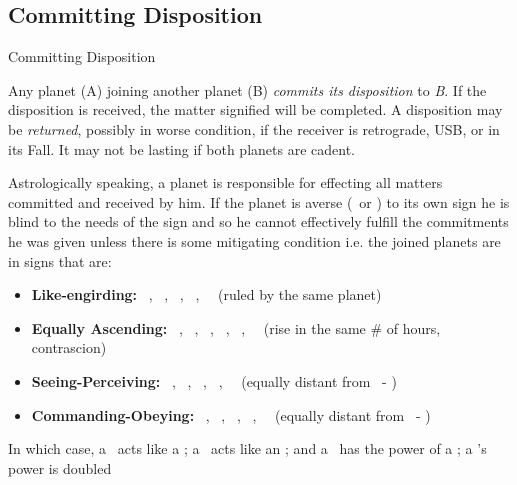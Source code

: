 \subsection{Committing Disposition}
\begin{frame}[t]{Committing Disposition}
\small
\begin{block}{}
Any planet (A) joining another planet (B) \textsl{commits its disposition} to \textsl{B}. If the disposition is received, the matter signified will be completed. A disposition may be \textsl{returned}, possibly in worse condition, if the receiver is retrograde, USB, or in its Fall.  It may not be lasting if both planets are cadent.
\end{block}

Astrologically speaking, a planet is responsible for effecting all matters committed and received by him. If the planet is averse (\Semisextile\ or \Quincunx) to its own sign he is blind to the needs of the sign  and so he cannot effectively fulfill the commitments he was given unless there is some mitigating condition i.e. the joined planets are in signs that are:\footnotemark[1]
\vspace{-0.25cm}
\begin{itemize}
\item \textbf{Like-engirding:}  \Aries\ \Scorpio, \Taurus\  \Libra, \Gemini\ \Virgo, \Sagittarius\ \Pisces,  \Capricorn\ \Aquarius\ (ruled by the same planet)

\item \textbf{Equally Ascending:}  \Aries\ \Pisces, \Taurus\ \Aquarius, \Gemini\ \Capricorn, \Cancer\ \Sagittarius, \Leo\ \Scorpio, \Virgo\ \Libra\ (rise in the same \# of hours, contrascion)

\item \textbf{Seeing-Perceiving:} \Aries\ \Libra, \Taurus\ \Virgo, \Gemini\ \Leo, \Scorpio\ \Pisces, \Sagittarius\ \Aquarius\ (equally distant from \Cancer\ - \Capricorn)

\item \textbf{Commanding-Obeying:} \Taurus\ \Pisces, \Gemini\ \Aquarius, \Cancer\ \Capricorn, \Leo\ \Sagittarius, \Virgo\ \Scorpio\ (equally distant from \Aries\ - \Libra)
\end{itemize}
\vspace{-0.25cm}
In which case, a \Semisextile\ acts like a \Conjunction; a \Quincunx\ acts like an \Opposition; and a \Sextile\ has the power of a \Trine; a \Square's power is doubled

\end{frame}

